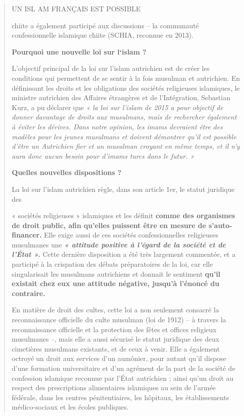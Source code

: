 \begin{quote}
UN ISL AM FRANÇAIS EST POSSIBLE

chiite a également participé aux discussions -- la communauté
confessionnelle islamique chiite (SCHIA, reconnue en 2013).

\textbf{Pourquoi une nouvelle loi sur l`islam ?}

L'objectif principal de la loi sur l'islam autrichien est de créer les
conditions qui permettent de se sentir à la fois musulman et autrichien.
En définissant les droits et les obligations des sociétés religieuses
islamiques, le ministre autrichien des Affaires étrangères et de
l'Intégration, Sebastian Kurz, a pu déclarer que \emph{« la loi sur
l'islam de 2015 a pour objectif de donner davantage de droits aux
musulmans, mais de rechercher également à éviter les dérives. Dans notre
opinion, les imams devraient être des modèles pour les jeunes musulmans
et doivent démontrer qu'il est possible d'être un Autrichien fier et un
musulman croyant en même temps, et il n'y aura donc aucun besoin pour
d'imams turcs dans le futur. »}

\textbf{Quelles nouvelles dispositions ?}

La loi sur l'islam autrichien règle, dans son article 1er, le statut
juridique des

« sociétés religieuses » islamiques et les définit \textbf{comme des
organismes de droit public, afin qu'elles puissent être en mesure de
s'auto-financer.} Elle exige aussi de ces sociétés confessionnelles
religieuses musulmanes une \emph{\textbf{« attitude positive à l'égard
de la société et de l'État ».}} Cette dernière disposition a été très
largement commentée, et a participé à la crispation des débats
préparatoires de la loi, car elle singularisait les musulmans
autrichiens et donnait le sentiment \textbf{qu'il existait chez eux une
attitude négative, jusqu'à l'énoncé du contraire.}

En matière de droit des cultes, cette loi a non seulement consacré la
reconnaissance officielle du culte musulman (loi de 1912) -- à travers
la reconnaissance officielle et la protection des fêtes et offices
religieux musulmanes --, mais elle a aussi sécurisé le statut juridique
des deux cimetières musulmans existants, et de ceux à venir. Elle a
également octroyé un droit aux services d'un aumônier, pour autant qu'il
dispose d'une formation universitaire et d'un agrément de la part de la
société de confession islamique reconnue par l'État autrichien ; ainsi
qu'un droit au respect des prescriptions alimentaires islamiques au sein
de l'armée fédérale, dans les centres pénitentiaires, les hôpitaux, les
établissements médico-sociaux et les écoles publiques.
\end{quote}

